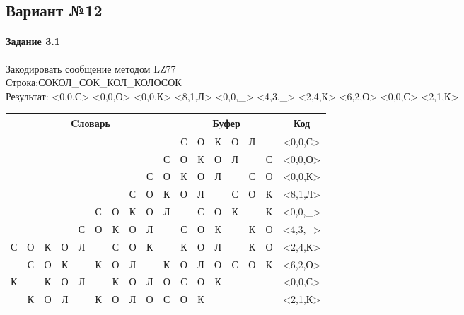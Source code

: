 \documentclass[a4paper, 12pt]{article}
\begin{document}
\pagebreak
\subsection{Вариант №12}
\paragraph{Задание 3.1}

Закодировать сообщение методом LZ77\\
Строка:СОКОЛ\_СОК\_КОЛ\_КОЛОСОК\\
Результат: <0,0,С> <0,0,О> <0,0,К> <8,1,Л> <0,0,\_> <4,3,\_> <2,4,К> <6,2,О> <0,0,С> <2,1,К>\\
\begin{table}[h!]
\centering
\begin{tabular}{|c|c|c|c|c|c|c|c|c|c|c|c|c|c|c|c|c|} 
\hline
\multicolumn{10}{|c|}{Cловарь} & \multicolumn{6}{c|}{Буфер} & Код  \\ \hline
  &   &   &   &   &   &   &   &   &   & \cellcolor[HTML]{8CE4F6} С & О & К & О & Л &   & <0,0,С>
\\ \hline
  &   &   &   &   &   &   &   &   & С & \cellcolor[HTML]{8CE4F6} О & К & О & Л &   & С & <0,0,О>
\\ \hline
  &   &   &   &   &   &   &   & С & О & \cellcolor[HTML]{8CE4F6} К & О & Л &   & С & О & <0,0,К>
\\ \hline
  &   &   &   &   &   &   & С & \cellcolor[HTML]{FFFF00} О & К & \cellcolor[HTML]{FFFF00} О & \cellcolor[HTML]{8CE4F6} Л &   & С & О & К & <8,1,Л>
\\ \hline
  &   &   &   &   & С & О & К & О & Л & \cellcolor[HTML]{8CE4F6}   & С & О & К &   & К & <0,0,\_>
\\ \hline
  &   &   &   & \cellcolor[HTML]{FFFF00} С & \cellcolor[HTML]{FFFF00} О & \cellcolor[HTML]{FFFF00} К & О & Л &   & \cellcolor[HTML]{FFFF00} С & \cellcolor[HTML]{FFFF00} О & \cellcolor[HTML]{FFFF00} К & \cellcolor[HTML]{8CE4F6}   & К & О & <4,3,\_>
\\ \hline
С & О & \cellcolor[HTML]{FFFF00} К & \cellcolor[HTML]{FFFF00} О & \cellcolor[HTML]{FFFF00} Л & \cellcolor[HTML]{FFFF00}   & С & О & К &   & \cellcolor[HTML]{FFFF00} К & \cellcolor[HTML]{FFFF00} О & \cellcolor[HTML]{FFFF00} Л & \cellcolor[HTML]{FFFF00}   & \cellcolor[HTML]{8CE4F6} К & О & <2,4,К>
\\ \hline
  & С & О & К &   & К & \cellcolor[HTML]{FFFF00} О & \cellcolor[HTML]{FFFF00} Л &   & К & \cellcolor[HTML]{FFFF00} О & \cellcolor[HTML]{FFFF00} Л & \cellcolor[HTML]{8CE4F6} О & С & О & К & <6,2,О>
\\ \hline
К &   & К & О & Л &   & К & О & Л & О & \cellcolor[HTML]{8CE4F6} С & О & К &   &   &   & <0,0,С>
\\ \hline
  & К & \cellcolor[HTML]{FFFF00} О & Л &   & К & О & Л & О & С & \cellcolor[HTML]{FFFF00} О & \cellcolor[HTML]{8CE4F6} К &   &   &   &   & <2,1,К>
\\ \hline
\end{tabular}
\end{table}
\end{document}
